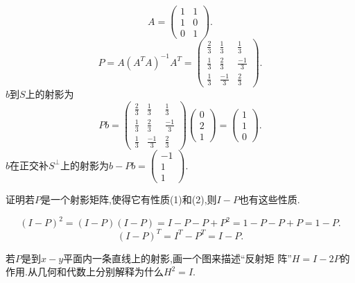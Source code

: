 ﻿\documentclass{book} \usepackage{exsheets} \usepackage{xeCJK}
\begin{document}
\begin{solution}
  $$ 
  A=
  \begin{pmatrix}
    1&1\\
    1&0\\
    0&1
  \end{pmatrix}.
 $$
$$
P=A(A^TA)^{-1}A^T=
\begin{pmatrix}
  \frac{2}{3}&\frac{1}{3}&\frac{1}{3}\\
  \frac{1}{3}&\frac{2}{3}&\frac{-1}{3}\\
  \frac{1}{3}&\frac{-1}{3}&\frac{2}{3}
\end{pmatrix}.
$$
$b$到$S$上的射影为
$$Pb=
\begin{pmatrix}
  \frac{2}{3}&\frac{1}{3}&\frac{1}{3}\\
  \frac{1}{3}&\frac{2}{3}&\frac{-1}{3}\\
  \frac{1}{3}&\frac{-1}{3}&\frac{2}{3}
\end{pmatrix}
\begin{pmatrix}
  0\\
  2\\
  1
\end{pmatrix}=
\begin{pmatrix}
  1\\
  1\\
  0
\end{pmatrix}.
$$
$b$在正交补$S^{\perp}$上的射影为$b-Pb=
\begin{pmatrix}
  -1\\
  1\\
  1
\end{pmatrix}
$.
\end{solution}
\begin{question}
  证明若$P$是一个射影矩阵,使得它有性质(1)和(2),则$I-P$也有这些性质.
\end{question}
\begin{solution}
  $$ 
  (I-P)^2=(I-P)(I-P)=I-P-P+P^2=1-P-P+P=1-P.
 $$
$$
(I-P)^{T}=I^{T}-P^{T}=I-P.
$$                  
\end{solution}
\begin{question}
  若$P$是到$x-y$平面内一条直线上的射影,画一个图来描述“反射矩
  阵”$H=I-2P$的作用.从几何和代数上分别解释为什么$H^2=I$.
\end{question}
\end{document}
